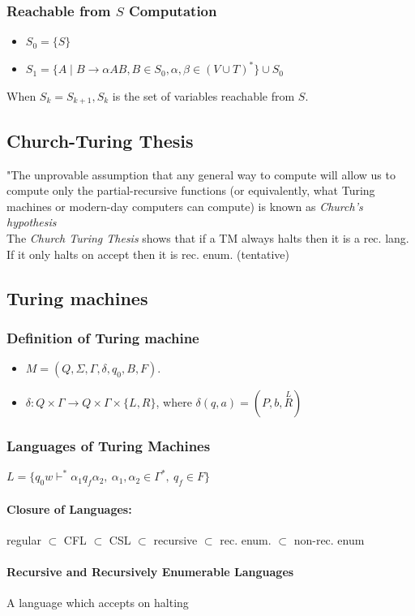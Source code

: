 \documentclass[20pt]{article} %
\begin{document}
\subsubsection{Reachable from $S$ Computation}
\begin{itemize}
\item $S_0 = \{S\}$
\item $S_1 = \{ A \mid B \rightarrow \alpha A B, B \in S_0, \alpha, \beta \in (V \cup T)^{*} \} \cup S_0$
\end{itemize}
When $S_k = S_{k+1}, S_k$ is the set of variables reachable from $S$.
\subsection{Church-Turing Thesis}
"The unprovable assumption that any general way to compute will allow us to compute only the partial-recursive functions (or equivalently, what Turing machines or modern-day computers can compute) is known as \textit{Church's hypothesis}\\
The \textit{Church Turing Thesis} shows that if a TM always halts then it is a rec. lang.  If it only halts on accept then it is rec. enum.  (tentative)
\subsection{Turing machines}
\subsubsection{Definition of Turing machine}
\begin{itemize}
\item $M = (Q, \Sigma, \Gamma, \delta, q_0, B, F)$.
\item $\delta: Q \times \Gamma \rightarrow Q \times \Gamma \times \{ L, R \}$, where $\delta(q,a) = (P, b, \overset{L}{R})$
\end{itemize}
\subsubsection{Languages of Turing Machines}
$L = \{ q_0 w \vdash^{*} \alpha_1q_f\alpha_2, \ \alpha_1, \alpha_2 \in \Gamma^{*}, \ q_f \in F \}$
\paragraph{Closure of Languages: } regular $\subset$ CFL $\subset$ CSL $\subset$ recursive $\subset$ rec. enum. $\subset$ non-rec. enum
\paragraph{Recursive and Recursively Enumerable Languages} A language which accepts on halting
\end{document}
